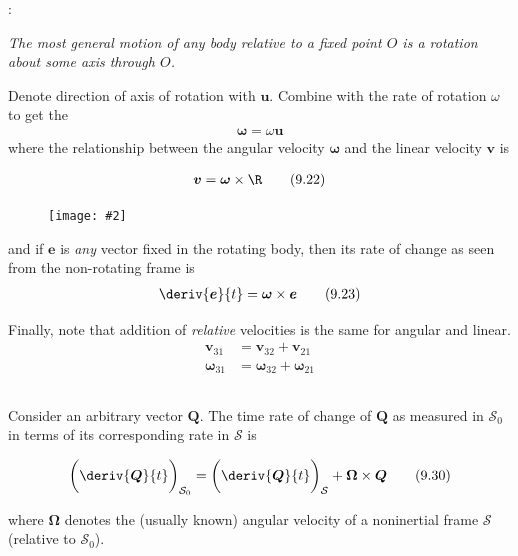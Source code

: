 \documentclass[10pt, twocolumn]{article}
\DeclareRobustCommand{\mybox}[2][gray!20]{%
	\begin{tcolorbox}[   %
		breakable,
		left=0pt,
		right=0pt,
		top=-13pt,
		bottom=0pt,
		colback=#1,
		colframe=#1,
		width=0.45\dimexpr\textwidth\relax,
		enlarge left by=0mm,
		boxsep=1pt,
		arc=0pt,outer arc=0pt,
		]
		#2
	\end{tcolorbox}
}
\newcommand\graybox[1]{ \mybox[gray!20]{\begin{align}#1\end{align}} }
\newcommand\myfig[2][0.3\textwidth]{\begin{figure}[h!]\centering\texttt{[image: \#2]}\end{figure}}
\newcommand{\myspace}{\vspace{3\bigskipamount}}
\newcommand\p{\Needspace{10\baselineskip} \noindent}
\newcommand\s{\mathcal{S}}
\newcommand\tlab[1]{\tag{#1}\label{#1}}
\begin{document}
\p {}: \begin{small}\textit{The most general motion of any body relative to a fixed point $O$ is a rotation about some axis through $O$.} \\ \end{small}

\p Denote direction of axis of rotation with $\bm{u}$. Combine with the rate of rotation $\omega$ to get the 
\begin{align}
\bm{\omega} = \omega \bm{u} \tlab{9.21}
\end{align}
where the relationship between the angular velocity $\bm{\omega}$ and the linear velocity $\bm{v}$ is 
\graybox{\bm{v} = \bm{\omega} \times \R   \tlab{9.22}}
\myfig{VelocityVector.PNG}
\p and if $\bm{e}$ is \textit{any} vector fixed in the rotating body, then its rate of change as seen from the non-rotating frame is 
\begin{align}
	\deriv{\bm{e}}{t} = \bm{\omega} \times \bm{e} \tlab{9.23} 
\end{align}

\p Finally, note that addition of \emph{relative} velocities is the same for angular and linear.
\begin{align}
	\bm{v}_{31} &= \bm{v}_{32} + \bm{v}_{21} \tlab{9.24} \\
	\bm{\omega}_{31} &= \bm{\omega}_{32} + \bm{\omega}_{21} \tlab{9.25}
\end{align}


\subsection{}

\p Consider an arbitrary vector $\bm{Q}$. The time rate of change of $\bm{Q}$ as measured in $\s_0$ in terms of its corresponding rate in $\s$ is
\graybox{ \bigg(\deriv{\bm{Q}}{t}\bigg)_{\s_0} =   \bigg(\deriv{\bm{Q}}{t}\bigg)_{\s}  + \bm{\Omega} \times \bm{Q}   \tlab{9.30}  }
where $\bm{\Omega}$ denotes the (usually known) angular velocity of a noninertial frame $\s$ (relative to $\s_0$). 
\myspace

\subsection{}
\end{document}
